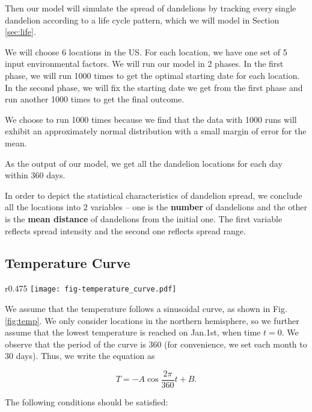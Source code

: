 \documentclass[12pt]{article}
\begin{document}
		\vspace{-0.5cm}
		Then our model will simulate the spread of dandelions by tracking every single dandelion according to a life cycle pattern, which we will model in Section \ref{sec:life}.  
		
		We will choose 6 locations in the US.  For each location, we have one set of 5 input environmental factors. We will run our model in 2 phases.  In the first phase, we will run 1000 times to get the optimal starting date for each location.  In the second phase, we will fix the starting date we get from the first phase and run another 1000 times to get the final outcome.
		
		We choose to run 1000 times because we find that the data with 1000 runs will exhibit an approximately normal distribution with a small margin of error for the mean.

		As the output of our model, we get all the dandelion locations for each day within 360 days.  
		
		In order to depict the statistical characteristics of dandelion spread, we conclude all the locations into 2 variables -- one is the \textbf{number} of dandelions and the other is the \textbf{mean distance} of dandelions from the initial one.  The first variable reflects spread intensity and the second one reflects spread range.


	
	\subsection{Temperature Curve}
	\label{sec:temp}
	
		\begin{wrapfigure}{r}{0.475\textwidth}
			\vspace{-0.4cm}
			\centering
			\texttt{[image: fig-temperature\_curve.pdf]}
			\caption{Temperature curve}
			\label{fig:temp}
		\end{wrapfigure}
		
		We assume that the temperature follows a sinusoidal curve, as shown in Fig.\ref{fig:temp}.  We only consider locations in the northern hemisphere, so we further assume that the lowest temperature is reached on Jan.1st, when time $t = 0$.  We observe that the period of the curve is 360 (for convenience, we set each month to 30 days).  Thus, we write the equation as
		
		\[
			T = -A \cos{\frac{2\pi}{360} t} + B.
		\]
		
		The following conditions should be satisfied:
		
\end{document}
